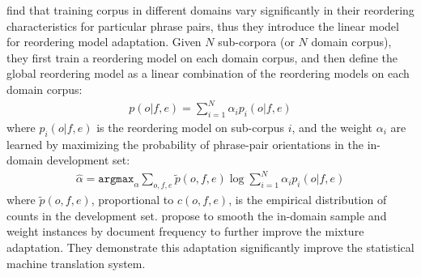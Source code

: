 \citet{Chen-2013} find that training corpus in different domains vary significantly in their reordering characteristics for particular phrase pairs, thus they introduce the linear model for reordering model adaptation. Given $N$ sub-corpora (or $N$ domain corpus), they first train a reordering model on each domain corpus, and then define the global reordering model as a linear combination of the reordering models on each domain corpus:
\begin{align}
p(o|f,e) = \sum_{i=1}^{N} \alpha_i p_i(o|f,e)
\end{align}
where $p_i(o|f,e)$ is the reordering model on sub-corpus $i$, and the weight $\alpha_i$ are learned by maximizing the probability of phrase-pair orientations in the in-domain development set:
\begin{align}
\hat{\alpha} = \texttt{argmax}_{\alpha} \sum_{o,f,e} \tilde{p}(o,f,e) \log \sum_{i=1}^N \alpha_i p_i(o|f,e)
\end{align}
where $\tilde{p}(o,f,e)$, proportional to $c(o,f,e)$, is the empirical distribution of counts in the development set. \citet{Chen-2013} propose to smooth the in-domain sample and weight instances by document frequency to further improve the mixture adaptation. They demonstrate this adaptation significantly improve the statistical machine translation system.

